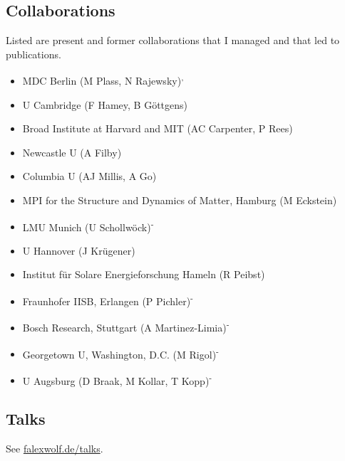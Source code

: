 \subsection*{Collaborations}
Listed are present and former collaborations that I managed and that led to publications. 
\begin{itemize}
\item MDC Berlin (M Plass, N Rajewsky)\textsuperscript{,}
\item U Cambridge (F Hamey, B Göttgens)
\item Broad Institute at Harvard and MIT (AC Carpenter, P Rees)
\item Newcastle U (A Filby)
\item Columbia U (AJ Millis, A Go)
\item MPI for the Structure and Dynamics of Matter, Hamburg (M Eckstein)
\item LMU Munich (U Schollwöck)\textsuperscript{-}
\item U Hannover (J Krügener)
\item Institut für Solare Energieforschung Hameln (R Peibst)
\item Fraunhofer IISB, Erlangen (P Pichler)\textsuperscript{-}
\item Bosch Research, Stuttgart (A Martinez-Limia)\textsuperscript{-}
\item Georgetown U, Washington, D.C. (M Rigol)\textsuperscript{-}
\item U Augsburg (D Braak, M Kollar, T Kopp)\textsuperscript{-}
\end{itemize}


\subsection*{Talks}
See \href{http://falexwolf.de/talks/}{falexwolf.de/talks}.
